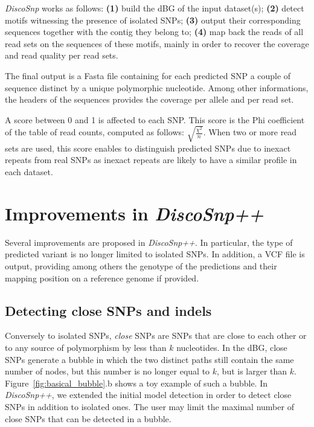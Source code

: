 \documentclass{bmcart}
\newcommand{\disco}{{\it DiscoSnp}\xspace}
\newcommand{\discopp}{{\it DiscoSnp++}\xspace}
\begin{document}
\disco works as follows: \textbf{(1)} build the dBG of the input dataset(s);  \textbf{(2)} detect motifs witnessing the presence of isolated SNPs; \textbf{(3)} output their corresponding sequences together with the contig they belong to; \textbf{(4)} map back the reads of all read sets on the sequences of these motifs, mainly in order to recover the coverage and read quality per read sets. 

The final output is a Fasta file containing for each predicted SNP a couple of sequence distinct by a unique polymorphic nucleotide. Among other informations, the headers of the sequences provides the coverage per allele and per read set. 

A score between 0 and 1 is affected to each SNP. This score is the Phi coefficient of the table of read counts, computed as follows: $\sqrt{\frac{\chi^2}{n}}$. When two or more read sets are used, this score enables to distinguish predicted SNPs due to inexact repeats from real SNPs as inexact repeats are likely to have a similar profile in each dataset.  



\section*{Improvements in \discopp}
Several improvements are proposed in \discopp. In particular, the type of predicted variant is no longer limited to isolated SNPs. In addition, a VCF file is output, providing among others the genotype of the predictions and their mapping position on a reference genome if provided.

\subsection*{Detecting close SNPs and indels}


Conversely to isolated SNPs, \emph{close} SNPs are SNPs that are close to each other or to any source of polymorphism by less than $k$ nucleotides.
In the dBG, close SNPs generate a bubble in which the two distinct paths still contain the same number of nodes, but this number is no longer equal to $k$, but is larger than $k$.
Figure~\ref{fig:basical_bubble}.b shows a toy example of such a bubble.  
In \discopp, we extended the initial model detection in order to detect close SNPs in addition to isolated ones. The user may limit the maximal number of close SNPs that can be detected in a bubble. %
\end{document}
